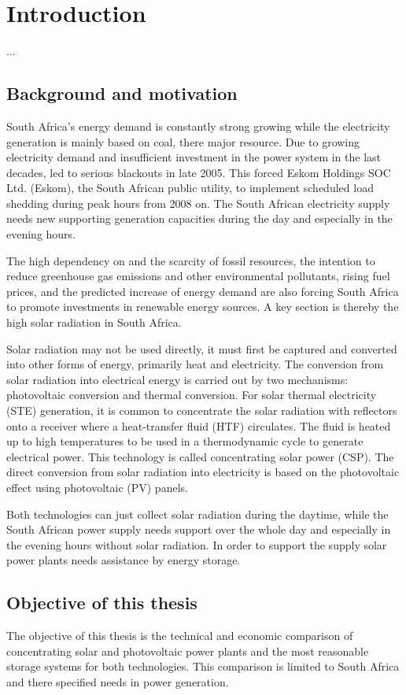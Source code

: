 \chapter{Introduction}
... %

\section{Background and motivation}
South Africa's energy demand is constantly strong growing while the electricity generation is mainly based on coal, there major resource. Due to growing electricity demand and insufficient investment in the power system in the last decades, led to serious blackouts in late 2005. This forced Eskom Holdings SOC Ltd. (Eskom), the South African public utility, to implement scheduled load shedding during peak hours from 2008 on. The South African electricity supply needs new supporting generation capacities during the day and especially in the evening hours. 

The high dependency on and the scarcity of fossil resources, the intention to reduce greenhouse gas emissions and other environmental pollutants, rising fuel prices, and the predicted increase of energy demand are also forcing South Africa to promote investments in renewable energy sources. A key section is thereby the high solar radiation in South Africa.

Solar radiation may not be used directly, it must first be captured and converted into other forms of energy, primarily heat and electricity. The conversion from solar radiation into electrical energy is carried out by two mechanisms: photovoltaic conversion and thermal conversion. For solar thermal electricity (STE) generation, it is common to concentrate the solar radiation with reflectors onto a receiver where a heat-transfer fluid (HTF) circulates. The fluid is heated up to high temperatures to be used in a thermodynamic cycle to generate electrical power. This technology is called concentrating solar power (CSP). The direct conversion from solar radiation into electricity is based on the photovoltaic effect using photovoltaic (PV) panels. 

Both technologies can just collect solar radiation during the daytime, while the South African power supply needs support over the whole day and especially in the evening hours without solar radiation. In order to support the supply solar power plants needs assistance by energy storage. 
\section{Objective of this thesis}
The objective of this thesis is the technical and economic comparison of concentrating solar and photovoltaic power plants and the most reasonable storage systems for both technologies. This comparison is limited to South Africa and there specified needs in power generation.

